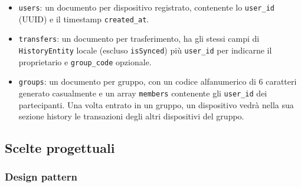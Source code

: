 \begin{itemize}[label={--}, leftmargin=1.2cm]
    \item \texttt{users}: un documento per dispositivo registrato, contenente lo \texttt{user\_id} (UUID) e il timestamp \texttt{created\_at}.

    \item \texttt{transfers}: un documento per trasferimento, ha gli stessi campi di \texttt{HistoryEntity} locale (escluso \texttt{isSynced}) più \texttt{user\_id} per indicarne il proprietario e \texttt{group\_code} opzionale.

    \item \texttt{groups}: un documento per gruppo, con un codice alfanumerico di 6 caratteri generato casualmente e un array \texttt{members} contenente gli \texttt{user\_id} dei partecipanti. Una volta entrato in un gruppo, un dispositivo vedrà nella sua sezione history le transazioni degli altri dispositivi del gruppo. 
\end{itemize}

\subsection{Scelte progettuali}

\subsubsection*{Design pattern}

